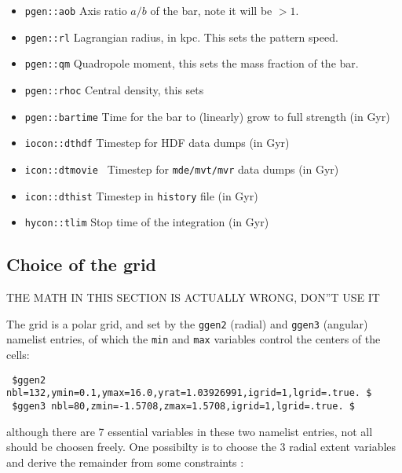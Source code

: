 \documentclass[11pt]{article}
\begin{document}
\begin{itemize}

\item
{\tt pgen::aob}
Axis ratio $a/b$ of the bar, note it will be $> 1$.

\item
{\tt pgen::rl}
Lagrangian radius, in kpc. This sets the pattern speed.

\item
{\tt pgen::qm}
Quadropole moment, this sets the mass fraction of the bar.

\item
{\tt pgen::rhoc}
Central density, this sets 

\item
{\tt pgen::bartime}
Time for the bar to (linearly) grow to full strength (in Gyr)

\item
{\tt iocon::dthdf}
Timestep for HDF data dumps (in Gyr)

\item
{\tt icon::dtmovie }
Timestep for {\tt mde/mvt/mvr} data dumps (in Gyr)

\item
{\tt icon::dthist}
Timestep in {\tt history} file (in Gyr)

\item
{\tt hycon::tlim}
Stop time of the integration (in Gyr)

\end{itemize}


\subsection{Choice of the grid}

{\Large THE MATH IN THIS SECTION IS ACTUALLY WRONG, DON''T USE IT}
\bigskip

The grid is a polar grid, and set by the {\tt ggen2} (radial) and 
{\tt ggen3} (angular) namelist entries, of which the {\tt min} and
{\tt max} variables control the centers of the cells:

\begin{verbatim}
 $ggen2 nbl=132,ymin=0.1,ymax=16.0,yrat=1.03926991,igrid=1,lgrid=.true. $
 $ggen3 nbl=80,zmin=-1.5708,zmax=1.5708,igrid=1,lgrid=.true. $
\end{verbatim}

although there are 7 essential variables in these 
two namelist entries, not all should be choosen freely. 
One possibilty is to choose the 3 radial extent variables
and derive the remainder from some constraints :
\end{document}
